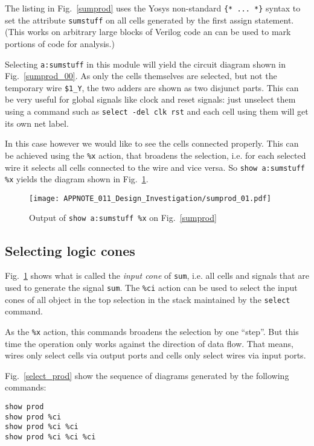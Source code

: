 \documentclass[9pt,technote,a4paper]{IEEEtran}
\begin{document}
The listing in Fig.~\ref{sumprod} uses the Yosys non-standard {\tt \{* ... *\}}
syntax to set the attribute {\tt sumstuff} on all cells generated by the first
assign statement. (This works on arbitrary large blocks of Verilog code an
can be used to mark portions of code for analysis.)

Selecting {\tt a:sumstuff} in this module will yield the circuit diagram shown
in Fig.~\ref{sumprod_00}. As only the cells themselves are selected, but not
the temporary wire {\tt \$1\_Y}, the two adders are shown as two disjunct
parts. This can be very useful for global signals like clock and reset signals: just
unselect them using a command such as {\tt select -del clk rst} and each cell
using them will get its own net label.

In this case however we would like to see the cells connected properly. This
can be achieved using the {\tt \%x} action, that broadens the selection, i.e.
for each selected wire it selects all cells connected to the wire and vice
versa. So {\tt show a:sumstuff \%x} yields the diagram shown in Fig.~\ref{sumprod_01}.

\begin{figure}[t]
\texttt{[image: APPNOTE\_011\_Design\_Investigation/sumprod\_01.pdf]}
\caption{Output of {\tt show a:sumstuff \%x} on Fig.~\ref{sumprod}}
\label{sumprod_01}
\end{figure}

\subsection{Selecting logic cones}

Fig.~\ref{sumprod_01} shows what is called the {\it input cone\/} of {\tt sum}, i.e.
all cells and signals that are used to generate the signal {\tt sum}. The {\tt \%ci}
action can be used to select the input cones of all object in the top selection
in the stack maintained by the {\tt select} command.

As the {\tt \%x} action, this commands broadens the selection by one ``step''. But
this time the operation only works against the direction of data flow. That means,
wires only select cells via output ports and cells only select wires via input ports.

Fig.~\ref{select_prod} show the sequence of diagrams generated by the following
commands:

\begin{verbatim}
show prod
show prod %ci
show prod %ci %ci
show prod %ci %ci %ci
\end{verbatim}
\end{document}
